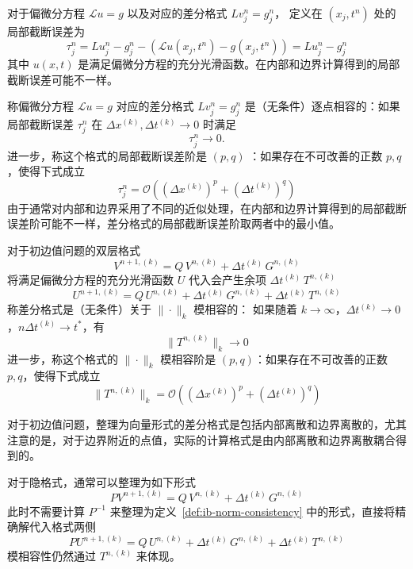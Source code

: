 \begin{definition}[局部截断误差]
    对于偏微分方程 $\mathcal{L} u = g$ 以及对应的差分格式 $L v_j^n = g_j^n$，
    定义在 $(x_j,t^n)$ 处的局部截断误差为
    \[
        \tau_j^n = L u_j^n - g_j^n - (\mathcal{L}u(x_j,t^n) - g(x_j,t^n)) = L u_j^n - g_j^n
    \]
    其中 $u(x,t)$ 是满足偏微分方程的充分光滑函数。在内部和边界计算得到的局部截断误差可能不一样。
\end{definition}

\begin{definition}[逐点相容性]
    称偏微分方程 $\mathcal{L} u = g$ 对应的差分格式 $L v_j^n = g_j^n$ 是（无条件）逐点相容的：如果局部截断误差 $\tau_j^n$ 在
    $\Delta x^{(k)},\Delta t^{(k)}\to 0$ 时满足
    \[
        \tau_j^n \to 0.
    \]
    进一步，称这个格式的局部截断误差阶是 $(p,q)$ ：如果存在不可改善的正数 $p,q$，使得下式成立
    \[
        \tau_j^n = \mathcal{O}((\Delta x^{(k)})^p + (\Delta t^{(k)})^q)
    \]
    由于通常对内部和边界采用了不同的近似处理，在内部和边界计算得到的局部截断误差阶可能不一样，差分格式的局部截断误差阶取两者中的最小值。
\end{definition}



\begin{definition}[模相容性]\label{def:ib-norm-consistency}
    对于初边值问题的双层格式
    \[
        V^{n+1,(k)} = Q \, V^{n,(k)} + \Delta t^{(k)}\, G^{n,(k)}
    \]
    将满足偏微分方程的充分光滑函数 $U$ 代入会产生余项 $\Delta t^{(k)}\, T^{n,(k)}$
    \[
        U^{n+1,(k)} = Q \, U^{n,(k)} + \Delta t^{(k)}\, G^{n,(k)} + \Delta t^{(k)}\, T^{n,(k)}
    \]
    称差分格式是（无条件）关于 $\|\cdot\|_k$ 模相容的：
    如果随着 $k \to \infty$，$\Delta t^{(k)} \to 0$，$n \Delta t^{(k)} \to t^*$，有
    \[
        \|T^{n,(k)}\|_{k} \to 0
    \]
    进一步，称这个格式的 $\|\cdot\|_k$ 模相容阶是 $(p,q)$：如果存在不可改善的正数 $p,q$，使得下式成立
    \[
        \|T^{n,(k)}\|_{k} = \mathcal{O}((\Delta x^{(k)})^p + (\Delta t^{(k)})^q)
    \]
\end{definition}

\begin{remark}
    对于初边值问题，整理为向量形式的差分格式是包括内部离散和边界离散的，尤其注意的是，对于边界附近的点值，实际的计算格式是由内部离散和边界离散耦合得到的。
\end{remark}

\begin{remark}
    对于隐格式，通常可以整理为如下形式
    \[
        P V^{n+1,(k)} = Q \, V^{n,(k)} + \Delta t^{(k)}\, G^{n,(k)}
    \]
    此时不需要计算 $P^{-1}$ 来整理为定义~\ref{def:ib-norm-consistency} 中的形式，直接将精确解代入格式两侧
    \[
        P U^{n+1,(k)} = Q \, U^{n,(k)} + \Delta t^{(k)}\, G^{n,(k)} + \Delta t^{(k)}\, T^{n,(k)}
    \]
    模相容性仍然通过 $T^{n,(k)}$ 来体现。
\end{remark}

